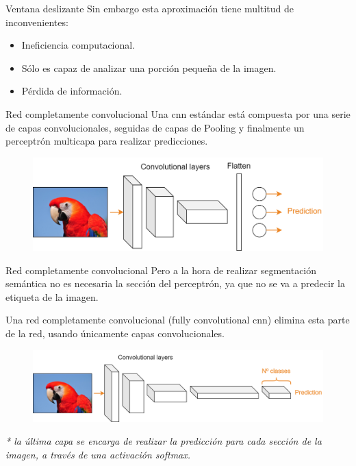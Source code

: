 \begin{frame}{Ventana deslizante}
Sin embargo esta aproximación tiene multitud de inconvenientes:
\begin{itemize}
    \item \alert{Ineficiencia computacional}.
    \item \alert{Sólo es capaz de analizar una porción pequeña de la imagen}.
    \item \alert{Pérdida de información}.
\end{itemize}
\end{frame}

\begin{frame}{Red completamente convolucional}
Una \alert{\gls{cnn} estándar} está compuesta por una serie de capas convolucionales, seguidas de capas de Pooling y finalmente un \alert{perceptrón multicapa} para realizar predicciones.

\begin{figure}
    \centering
    \includegraphics[width=\textwidth]{Slides/figures/Tema 4/StandardCNN.png}
\end{figure}
\end{frame}

\begin{frame}{Red completamente convolucional}
Pero a la hora de realizar \alert{segmentación semántica} no es necesaria la sección del \alert{perceptrón}, ya que no se va a predecir la etiqueta de la imagen.

Una red \alert{completamente convolucional} (fully convolutional \gls{cnn})\cite{long2015fully} elimina esta parte de la red, usando únicamente capas convolucionales.

\begin{figure}
    \centering
    \includegraphics[width=\textwidth]{Slides/figures/Tema 4/FullyCNN.png}
\end{figure}

\textit{* la última capa se encarga de realizar la predicción para cada sección de la imagen, a través de una activación softmax.}
\end{frame}

